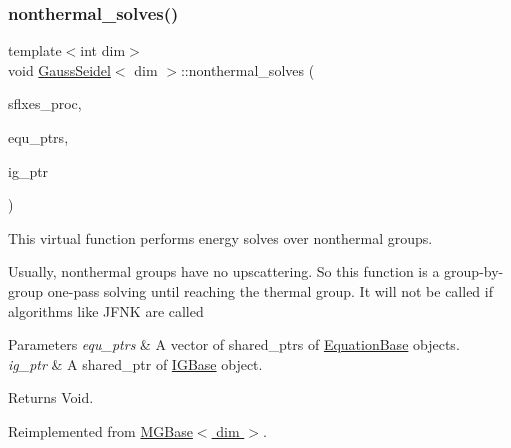 \subsubsection{\texorpdfstring{nonthermal\+\_\+solves()}{nonthermal\_solves()}}
{\footnotesize\ttfamily template$<$int dim$>$ \\
void \hyperlink{class_gauss_seidel}{Gauss\+Seidel}$<$ dim $>$\+::nonthermal\+\_\+solves (\begin{DoxyParamCaption}\item[{std\+::vector$<$ Vector$<$ double $>$ $>$ \&}]{sflxes\+\_\+proc,  }\item[{std\+::vector$<$ std\+\_\+cxx11\+::shared\+\_\+ptr$<$ \hyperlink{class_equation_base}{Equation\+Base}$<$ dim $>$ $>$ $>$ \&}]{equ\+\_\+ptrs,  }\item[{std\+\_\+cxx11\+::shared\+\_\+ptr$<$ \hyperlink{class_i_g_base}{I\+G\+Base}$<$ dim $>$ $>$}]{ig\+\_\+ptr }\end{DoxyParamCaption})\hspace{0.3cm}{\ttfamily [virtual]}}

This virtual function performs energy solves over nonthermal groups.

Usually, nonthermal groups have no upscattering. So this function is a group-\/by-\/ group one-\/pass solving until reaching the thermal group. It will not be called if algorithms like J\+F\+NK are called


\begin{DoxyParams}{Parameters}
{\em equ\+\_\+ptrs} & A vector of shared\+\_\+ptr\textquotesingle{}s of \hyperlink{class_equation_base}{Equation\+Base} objects. \\
\hline
{\em ig\+\_\+ptr} & A shared\+\_\+ptr of \hyperlink{class_i_g_base}{I\+G\+Base} object. \\
\hline
\end{DoxyParams}
\begin{DoxyReturn}{Returns}
Void. 
\end{DoxyReturn}


Reimplemented from \hyperlink{class_m_g_base_a55ba9bef3616dd5eab9e3986f6e8e311}{M\+G\+Base$<$ dim $>$}.

\mbox{\label{class_gauss_seidel_a8db6abbdc88413cbf502ac606b415733}} 
